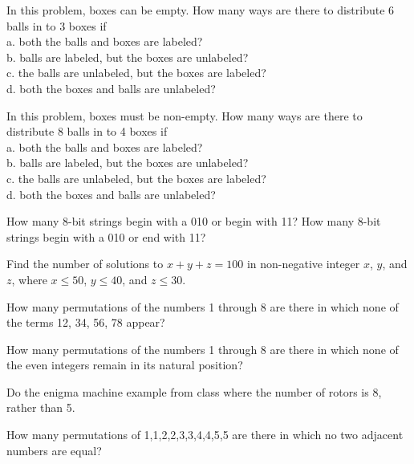 
\begin{exercise}
In this problem, boxes can be empty. How many ways are there to distribute 6 balls in to 3 boxes if\\
a. both the balls and boxes are labeled?\\
b. balls are labeled, but the boxes are unlabeled?\\
c. the balls are unlabeled, but the boxes are labeled?\\
d. both the boxes and balls are unlabeled?
\end{exercise}

\begin{exercise}
In this problem, boxes must be non-empty. How many ways are there to distribute 8 balls in to 4 boxes if\\
a. both the balls and boxes are labeled?\\
b. balls are labeled, but the boxes are unlabeled?\\
c. the balls are unlabeled, but the boxes are labeled?\\
d. both the boxes and balls are unlabeled?
\end{exercise}

\begin{exercise}
How many 8-bit strings begin with a 010 or begin with 11?  How many 8-bit strings begin with a 010 or end with 11?
\end{exercise}

\begin{exercise}
Find the number of solutions to $x+y+z=100$ in non-negative integer $x$, $y$, and $z$, where $x \le 50$, $y \le 40$, and $z \le 30$.
\end{exercise}

\begin{exercise}
How many permutations of the numbers 1 through 8 are there in which none of the terms 12, 34, 56, 78 appear?
\end{exercise}

\begin{exercise}
How many permutations of the numbers 1 through 8 are there in which none of the even integers remain in its natural position?
\end{exercise}

\begin{exercise}
Do the enigma machine example from class where the number of rotors is 8, rather than 5.
\end{exercise}

\begin{exercise}
How many permutations of 1,1,2,2,3,3,4,4,5,5 are there in which no two adjacent numbers are equal?
\end{exercise}

